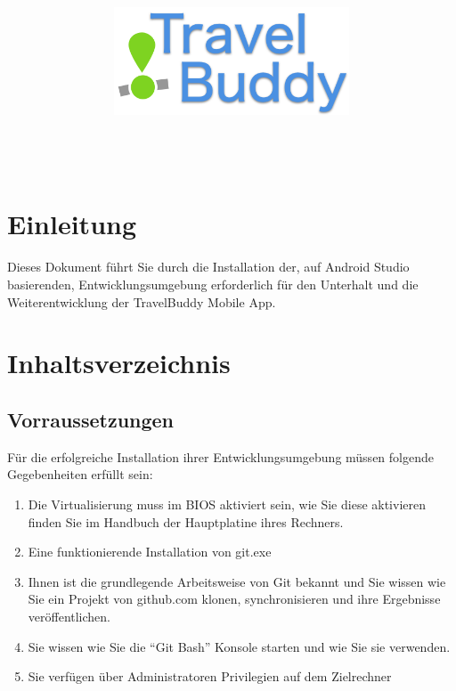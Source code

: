 \documentclass[a4paper,10pt,xetex]{article}
\title{
  \includegraphics[width=7cm]{travel-buddy_white}\\[\bigskipamount]
  \documenttitle\\[\bigskipamount]
}
\author{\documentauthors}
\date{\parbox{\linewidth}{\centering%
  IT15TA ZH \hspace*{3cm} Gruppe 3\endgraf\bigskip
  Dokumentversion \documentversion, \documentdate\endgraf
}}
\begin{document}
\maketitle\newpage

\section{Einleitung}
Dieses Dokument führt Sie durch die Installation der, auf Android Studio basierenden, Entwicklungsumgebung erforderlich für den Unterhalt und die Weiterentwicklung der TravelBuddy Mobile App.

\section{Inhaltsverzeichnis}
{
\hypersetup{linkcolor=black}
\setcounter{tocdepth}{3}
\renewcommand{\baselinestretch}{0.99}\normalsize
\tableofcontents
\renewcommand{\baselinestretch}{1.0}\normalsize
}

\newpage

\subsection{Vorraussetzungen}
Für die erfolgreiche Installation ihrer Entwicklungsumgebung müssen folgende Gegebenheiten erfüllt sein:
\begin{enumerate}
  \item Die Virtualisierung muss im BIOS aktiviert sein, wie Sie diese aktivieren finden Sie im Handbuch der Hauptplatine ihres Rechners.
  \item Eine funktionierende Installation von git.exe
  \item Ihnen ist die grundlegende Arbeitsweise von Git bekannt und Sie wissen wie Sie ein Projekt von github.com klonen, synchronisieren und ihre Ergebnisse veröffentlichen.
  \item Sie wissen wie Sie die ``Git Bash'' Konsole starten und wie Sie sie verwenden.
  \item Sie verfügen über Administratoren Privilegien auf dem Zielrechner
\end{enumerate}
\end{document}

